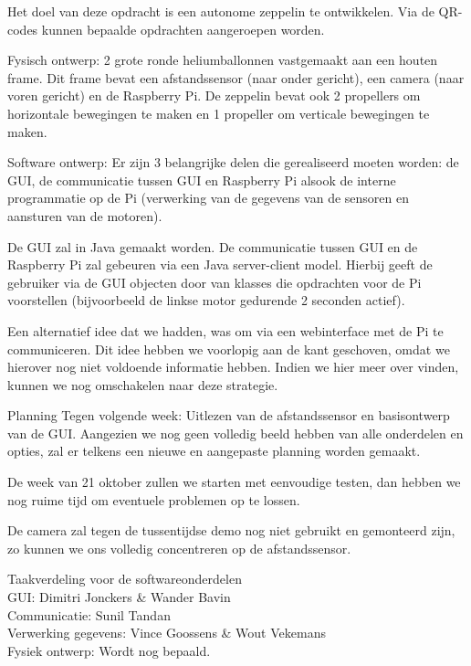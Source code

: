 \documentclass{peno-opdracht1}
\begin{document}
\maketitle

Het doel van deze opdracht is een autonome zeppelin te ontwikkelen. Via de QR-codes kunnen bepaalde opdrachten aangeroepen worden.

Fysisch ontwerp: 2 grote ronde heliumballonnen vastgemaakt aan een houten frame. Dit frame bevat een afstandssensor (naar onder gericht), een camera (naar voren gericht) en de Raspberry Pi. De zeppelin bevat ook 2 propellers om horizontale bewegingen te maken en 1 propeller om verticale bewegingen te maken.

Software ontwerp: Er zijn 3 belangrijke delen die gerealiseerd moeten worden: de GUI, de communicatie tussen GUI en Raspberry Pi alsook de interne programmatie op de Pi (verwerking van de gegevens van de sensoren en aansturen van de motoren).

De GUI zal in Java gemaakt worden. De communicatie tussen GUI en de Raspberry Pi zal gebeuren via een Java server-client model. Hierbij geeft de gebruiker via de GUI objecten door van klasses die opdrachten voor de Pi voorstellen (bijvoorbeeld de linkse motor gedurende 2 seconden actief).

Een alternatief idee dat we hadden, was om via een webinterface met de Pi te communiceren. Dit idee hebben we voorlopig aan de kant geschoven, omdat we hierover nog niet voldoende informatie hebben. Indien we hier meer over vinden, kunnen we nog omschakelen naar deze strategie.

Planning
Tegen volgende week: Uitlezen van de afstandssensor en basisontwerp van de GUI. Aangezien we nog geen volledig beeld hebben van alle onderdelen en opties, zal er telkens een nieuwe en aangepaste planning worden gemaakt.

De week van 21 oktober zullen we starten met eenvoudige testen, dan hebben we nog ruime tijd om eventuele problemen op te lossen.

De camera zal tegen de tussentijdse demo nog niet gebruikt en gemonteerd zijn, zo kunnen we ons volledig concentreren op de afstandssensor.

Taakverdeling voor de softwareonderdelen\\
GUI: Dimitri Jonckers \& Wander Bavin\\
Communicatie: Sunil Tandan\\
Verwerking gegevens: Vince Goossens \& Wout Vekemans\\
Fysiek ontwerp: Wordt nog bepaald.\\
\end{document}

